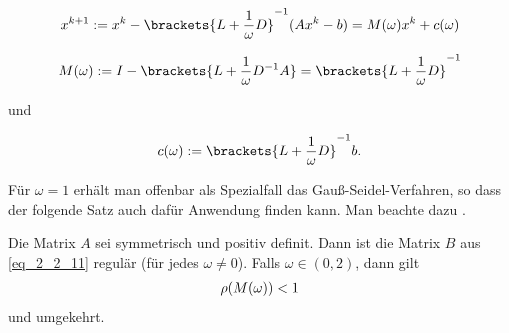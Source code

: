 \begin{align}
	x^{k+1} := x^k - \brackets{L+\frac{1}{\omega}D}^{-1}(Ax^k - b) = M(\omega)x^k + c(\omega)\notag
\end{align}

\begin{align}
	M(\omega) := I -  \brackets{L + \frac{1}{\omega} D^{-1} A} 
	= \brackets{L + \frac{1}{\omega} D}^{-1}
\end{align}

und

\begin{align}
	c(\omega) :=  \brackets{L+\frac{1}{\omega}D}^{-1}b.
\end{align}

Für $\omega = 1$ erhält man offenbar als Spezialfall das Gauß-Seidel-Verfahren, so dass der folgende Satz auch dafür Anwendung finden kann. Man beachte dazu .

\begin{proposition}
	Die Matrix $A$ sei symmetrisch und positiv definit. Dann ist die Matrix $B$ aus \cref{eq_2_2_11} regulär (für jedes $\omega \neq 0$). Falls $\omega \in (0,2)$, dann gilt
	\begin{align}
		\rho(M(\omega)) < 1\notag
	\end{align}
	und umgekehrt.
\end{proposition}

